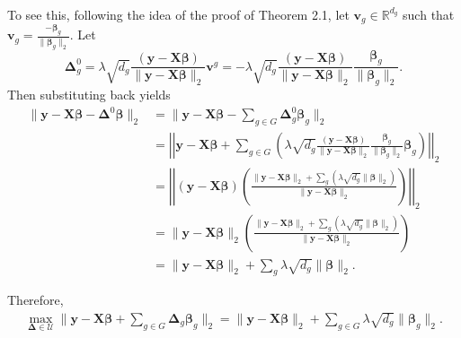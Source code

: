 \documentclass{article}%
\begin{document}
\begin{solution}
\begin{align}
\end{align}
To see this, following the idea of the proof of Theorem 2.1, let $\mathbf{v}_g \in \mathbb{R}^{d_g}$ such that $\mathbf{v}_g = \frac{-\boldsymbol{\beta}_g}{\|\boldsymbol{\beta}_g\|_2}$.  Let 
$$
\mathbf{\Delta}_g^0 = \lambda \sqrt{d_g} \frac{(\mathbf{y} - \mathbf{X}\boldsymbol{\beta} )}{\|\mathbf{y} - \mathbf{X}\boldsymbol{\beta} \|_2} \mathbf{v}^g = -\lambda \sqrt{d_g} \frac{(\mathbf{y} - \mathbf{X}\boldsymbol{\beta} )}{\|\mathbf{y} - \mathbf{X}\boldsymbol{\beta} \|_2} \frac{\boldsymbol{\beta}_g}{\|\boldsymbol{\beta}_g\|_2}.
$$
Then substituting back yields  
\begin{align}
    \|\mathbf{y} - \mathbf{X}\boldsymbol{\beta} - \mathbf{\Delta}^0\boldsymbol{\beta}\|_2 &= \|\mathbf{y} - \mathbf{X}\boldsymbol{\beta}  - \sum_{g \in G}\mathbf{\Delta}^0_g\boldsymbol{\beta}_g\|_2  \\
    &= \left | \left| \mathbf{y} - \mathbf{X}\boldsymbol{\beta}  +\sum_{g \in G}(\lambda \sqrt{d_g} \frac{(\mathbf{y} - \mathbf{X}\boldsymbol{\beta} )}{\|\mathbf{y} - \mathbf{X}\boldsymbol{\beta} \|_2} \frac{\boldsymbol{\beta}_g}{\|\boldsymbol{\beta}_g\|_2} \boldsymbol{\beta}_g ) \right | \right|_2  \\
    &= \left | \left| (\mathbf{y} - \mathbf{X}\boldsymbol{\beta}) \left( \frac{\|\mathbf{y} - \mathbf{X}\boldsymbol{\beta}\|_2 + \sum_g (\lambda\sqrt{d_g}\|\boldsymbol{\beta}\|_2 )}{\|\mathbf{y} - \mathbf{X}\boldsymbol{\beta}\|_2} \right) \right | \right|_2 \\
    &= \|\mathbf{y} - \mathbf{X}\boldsymbol{\beta}\|_2 \left( \frac{\|\mathbf{y} - \mathbf{X}\boldsymbol{\beta}\|_2+\sum_g(\lambda\sqrt{d_g}\|\boldsymbol{\beta}\|_2)}{\|\mathbf{y} - \mathbf{X}\boldsymbol{\beta}\|_2} \right) \\
    &= \|\mathbf{y} - \mathbf{X}\boldsymbol{\beta}\|_2 + \sum_g \lambda\sqrt{d_g}\|\boldsymbol{\beta}\|_2.
\end{align}

Therefore, 
\begin{align}
    \max_{\mathbf{\Delta} \in \mathcal{U}} \|\mathbf{y} - \mathbf{X}\boldsymbol{\beta}  + \sum_{g \in G}\mathbf{\Delta}_g\boldsymbol{\beta}_g\|_2  = \|\mathbf{y} - \mathbf{X}\boldsymbol{\beta} \|_2 + \sum_{g \in G}\lambda\sqrt{d_g}\| \boldsymbol{\beta}_g\|_2.
\end{align}

\end{solution}
\clearpage
\end{document}
